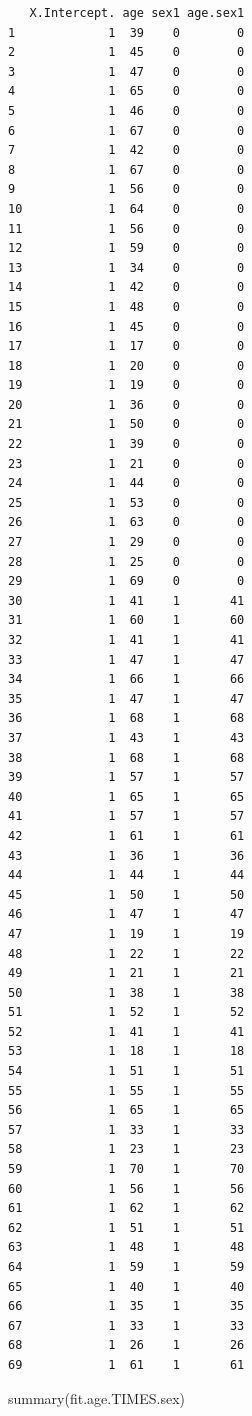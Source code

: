 \documentclass[
  letterpaper,
]{scrbook}
\newenvironment{Shaded}{\begin{snugshade}}{\end{snugshade}}
\newcommand{\FunctionTok}[1]{\textcolor[rgb]{0.28,0.35,0.67}{#1}}
\newcommand{\NormalTok}[1]{\textcolor[rgb]{0.00,0.23,0.31}{#1}}
\begin{document}
\begin{verbatim}
   X.Intercept. age sex1 age.sex1
1             1  39    0        0
2             1  45    0        0
3             1  47    0        0
4             1  65    0        0
5             1  46    0        0
6             1  67    0        0
7             1  42    0        0
8             1  67    0        0
9             1  56    0        0
10            1  64    0        0
11            1  56    0        0
12            1  59    0        0
13            1  34    0        0
14            1  42    0        0
15            1  48    0        0
16            1  45    0        0
17            1  17    0        0
18            1  20    0        0
19            1  19    0        0
20            1  36    0        0
21            1  50    0        0
22            1  39    0        0
23            1  21    0        0
24            1  44    0        0
25            1  53    0        0
26            1  63    0        0
27            1  29    0        0
28            1  25    0        0
29            1  69    0        0
30            1  41    1       41
31            1  60    1       60
32            1  41    1       41
33            1  47    1       47
34            1  66    1       66
35            1  47    1       47
36            1  68    1       68
37            1  43    1       43
38            1  68    1       68
39            1  57    1       57
40            1  65    1       65
41            1  57    1       57
42            1  61    1       61
43            1  36    1       36
44            1  44    1       44
45            1  50    1       50
46            1  47    1       47
47            1  19    1       19
48            1  22    1       22
49            1  21    1       21
50            1  38    1       38
51            1  52    1       52
52            1  41    1       41
53            1  18    1       18
54            1  51    1       51
55            1  55    1       55
56            1  65    1       65
57            1  33    1       33
58            1  23    1       23
59            1  70    1       70
60            1  56    1       56
61            1  62    1       62
62            1  51    1       51
63            1  48    1       48
64            1  59    1       59
65            1  40    1       40
66            1  35    1       35
67            1  33    1       33
68            1  26    1       26
69            1  61    1       61
\end{verbatim}

\begin{Shaded}
\begin{Highlighting}[]
\FunctionTok{summary}\NormalTok{(fit.age.TIMES.sex)}
\end{Highlighting}
\end{Shaded}
\end{document}
